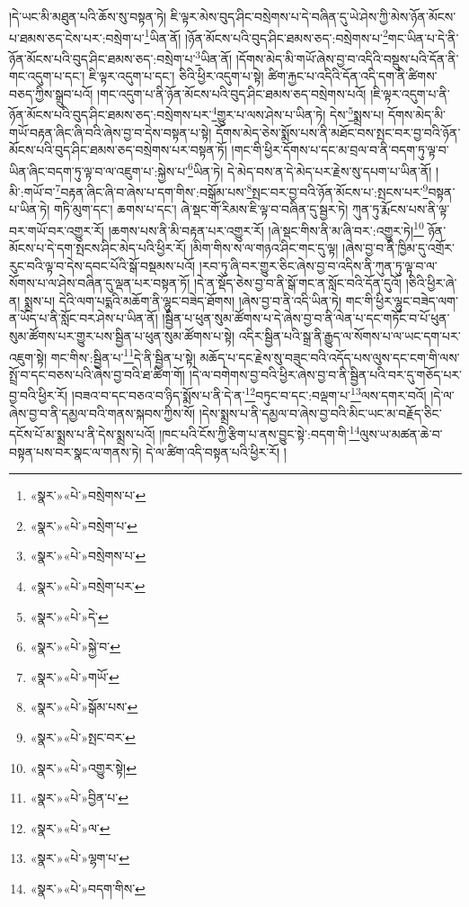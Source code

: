 །དེ་ཡང་མི་མཐུན་པའི་ཆོས་སུ་བསྟན་ཏེ། ཇི་ལྟར་མེས་བུད་ཤིང་བསྲེགས་པ་དེ་བཞིན་དུ་ཡེ་ཤེས་ཀྱི་མེས་ཉོན་མོངས་པ་ཐམས་ཅད་ངེས་པར་:བསྲེག་པ་\footnote{«སྣར་»«པེ་»བསྲེགས་པ་}ཡིན་ནོ། །ཉོན་མོངས་པའི་བུད་ཤིང་ཐམས་ཅད་:བསྲེགས་པ་\footnote{«སྣར་»«པེ་»བསྲེག་པ་}གང་ཡིན་པ་དེ་ནི་ཉོན་མོངས་པའི་བུད་ཤིང་ཐམས་ཅད་:བསྲེག་པ་\footnote{«སྣར་»«པེ་»བསྲེགས་པ་}ཡིན་ནོ། །དོགས་མེད་མི་གཡོ་ཞེས་བྱ་བ་འདིའི་བསྡུས་པའི་དོན་ནི་གང་འདུག་པ་དང་། ཇི་ལྟར་འདུག་པ་དང་། ཅིའི་ཕྱིར་འདུག་པ་སྟེ། ཚིག་རྐྱང་པ་འདིའི་དོན་འདི་དག་ནི་ཚིགས་བཅད་ཀྱིས་སྒྲུབ་པའོ། །གང་འདུག་པ་ནི་ཉོན་མོངས་པའི་བུད་ཤིང་ཐམས་ཅད་བསྲེགས་པའོ། །ཇི་ལྟར་འདུག་པ་ནི་ཉོན་མོངས་པའི་བུད་ཤིང་ཐམས་ཅད་:བསྲེགས་པར་\footnote{«སྣར་»«པེ་»བསྲེག་པར་}གྱུར་པ་ལས་ཤེས་པ་ཡིན་ཏེ། དེས་\footnote{«སྣར་»«པེ་»དེ་}སྨྲས་པ། དོགས་མེད་མི་གཡོ་བརྟན་ཞིང་ཞི་བའི་ཞེས་བྱ་བ་དེས་བསྟན་པ་སྟེ། དོགས་མེད་ཅེས་སྨོས་པས་ནི་མཐོང་བས་སྤང་བར་བྱ་བའི་ཉོན་མོངས་པའི་བུད་ཤིང་ཐམས་ཅད་བསྲེགས་པར་བསྟན་ཏོ། །གང་གི་ཕྱིར་དོགས་པ་དང་མ་བྲལ་བ་ནི་བདག་ཏུ་ལྟ་བ་ཡིན་ཞིང་བདག་ཏུ་ལྟ་བ་ལ་འཇུག་པ་:སྐྱེས་པ་\footnote{«སྣར་»«པེ་»སྐྱེ་བ་}ཡིན་ཏེ། དེ་མེད་བས་ན་དེ་མེད་པར་རྗེས་སུ་དཔག་པ་ཡིན་ནོ། །མི་:གཡོ་བ་\footnote{«སྣར་»«པེ་»གཡོ་}བརྟན་ཞིང་ཞི་བ་ཞེས་པ་དག་གིས་:བསྒོམ་པས་\footnote{«སྣར་»«པེ་»སྒོམ་པས་}སྤང་བར་བྱ་བའི་ཉོན་མོངས་པ་:སྤངས་པར་\footnote{«སྣར་»«པེ་»སྤང་བར་}བསྟན་པ་ཡིན་ཏེ། གཏི་མུག་དང་། ཆགས་པ་དང་། ཞེ་སྡང་གོ་རིམས་ཇི་ལྟ་བ་བཞིན་དུ་སྦྱར་ཏེ། ཀུན་ཏུ་རྨོངས་པས་ནི་ལྟ་བར་གཡོ་བར་འགྱུར་རོ། །ཆགས་པས་ནི་མི་བརྟན་པར་འགྱུར་རོ། །ཞེ་སྡང་གིས་ནི་མ་ཞི་བར་:འགྱུར་ཏེ།\footnote{«སྣར་»«པེ་»འགྱུར་སྟེ།} ཉོན་མོངས་པ་དེ་དག་སྤངས་ཤིང་མེད་པའི་ཕྱིར་རོ། །མིག་གིས་ས་ལ་གཉའ་ཤིང་གང་དུ་ལྟ། །ཞེས་བྱ་བ་ནི་ཁྱིམ་དུ་འགྲོར་རུང་བའི་ལྟ་བ་དེས་དབང་པོའི་སྒོ་བསྡམས་པའོ། །རབ་ཏུ་ཞི་བར་གྱུར་ཅིང་ཞེས་བྱ་བ་འདིས་ནི་ཀུན་ཏུ་ལྟ་བ་ལ་སོགས་པ་ལ་ཤེས་བཞིན་དུ་ལྡན་པར་བསྟན་ཏོ། །དེ་ན་སྡོད་ཅེས་བྱ་བ་ནི་སྒོ་གང་ན་སློང་བའི་དོན་དུའོ། །ཅིའི་ཕྱིར་ཞེ་ན། སྨྲས་པ། དེའི་ལག་པདྨའི་མཆོག་ནི་ལྷུང་བཟེད་ཐོགས། །ཞེས་བྱ་བ་ནི་འདི་ཡིན་ཏེ། གང་གི་ཕྱིར་ལྷུང་བཟེད་ལག་ན་ཡོད་པ་ནི་སློང་བར་ཤེས་པ་ཡིན་ནོ། །སྦྱིན་པ་ཕུན་སུམ་ཚོགས་པ་དེ་ཞེས་བྱ་བ་ནི་ལེན་པ་དང་གཏོང་བ་པོ་ཕུན་སུམ་ཚོགས་པར་གྱུར་པས་སྦྱིན་པ་ཕུན་སུམ་ཚོགས་པ་སྟེ། འདིར་སྦྱིན་པའི་སྒྲ་ནི་རྒྱུད་ལ་སོགས་པ་ལ་ཡང་དག་པར་འཇུག་སྟེ། གང་གིས་:སྦྱིན་པ་\footnote{«སྣར་»«པེ་»བྱིན་པ་}དེ་ནི་སྦྱིན་པ་སྟེ། མཆོད་པ་དང་རྗེས་སུ་བཟུང་བའི་འདོད་པས་ལུས་དང་ངག་གི་ལས་སྤྲོ་བ་དང་བཅས་པའི་ཞེས་བྱ་བའི་ཐ་ཚིག་གོ། །དེ་ལ་བགེགས་བྱ་བའི་ཕྱིར་ཞེས་བྱ་བ་ནི་སྦྱིན་པའི་བར་དུ་གཅོད་པར་བྱ་བའི་ཕྱིར་རོ། །བཟའ་བ་དང་བཅའ་བ་ཉིད་སྨོས་པ་ནི་དེ་ན་\footnote{«སྣར་»«པེ་»ལ་}བཏུང་བ་དང་:བལྡག་པ་\footnote{«སྣར་»«པེ་»ལྷག་པ་}ལས་དགར་བའོ། །དེ་ལ་ཞེས་བྱ་བ་ནི་དམྱལ་བའི་གནས་སྐབས་ཀྱིས་སོ། །དེས་སྨྲས་པ་ནི་དམྱལ་བ་ཞེས་བྱ་བའི་མིང་ཡང་མ་བརྗོད་ཅིང་དངོས་པོ་མ་སྨྲས་པ་ནི་དེས་སྨྲས་པའོ། །ཁང་པའི་ངོས་ཀྱི་རྩིག་པ་ནས་བྱུང་སྟེ་:བདག་གི་\footnote{«སྣར་»«པེ་»བདག་གིས་}ལུས་ཡ་མཚན་ཆེ་བ་བསྟན་པས་བར་སྣང་ལ་གནས་ཏེ། དེ་ལ་ཚིག་འདི་བསྟན་པའི་ཕྱིར་རོ། །
